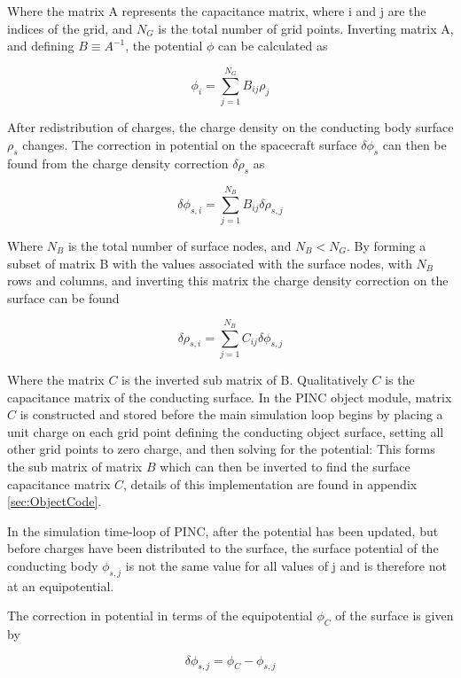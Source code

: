 Where the matrix A represents the capacitance matrix, where i and j are the indices of the grid, and $N_G$ is the total number of grid points. Inverting matrix A, and defining $B \equiv A^{-1}$, the potential $\phi$ can be calculated as 

\begin{equation}
    \phi_i = \sum^{N_G}_{j=1} B_{ij} \rho_j
\end{equation}


After redistribution of charges, the charge density on the conducting body surface $\rho_s$ changes. The correction in potential on the spacecraft surface $\delta \phi_s$ can then be found from the charge density correction $\delta \rho_s$ as

\begin{equation}
    \delta \phi_{s,i} = \sum^{N_B}_{j=1} B_{ij} \delta \rho_{s,j}
\end{equation}

Where $N_B$ is the total number of surface nodes, and $N_B < N_G$. By forming a subset of matrix B with the values associated with the surface nodes, with $N_B$ rows and columns, and inverting this matrix the charge density correction on the surface can be found

\begin{equation}\label{eq:SCchargeCorr}
    \delta \rho_{s,i} = \sum^{N_B}_{j=1} C_{ij} \delta \phi_{s,j}
\end{equation}

Where the matrix $C$ is the inverted sub matrix of B. Qualitatively $C$ is the capacitance matrix of the conducting surface. In the PINC object module, matrix $C$ is constructed and stored before the main simulation loop begins by placing a unit charge on each grid point defining the conducting object surface, setting all other grid points to zero charge, and then solving for the potential: This forms the sub matrix of matrix $B$ which can then be inverted to find the surface capacitance matrix $C$, details of this implementation are found in appendix \ref{sec:ObjectCode}.

In the simulation time-loop of PINC, after the potential has been updated, but before charges have been distributed to the surface, the surface potential of the conducting body $\phi_{s,j}$ is not the same value for all values of j and is therefore not at an equipotential. 

The correction in potential in terms of the equipotential $\phi_C$ of the surface is given by

\begin{equation}\label{eq:SCphiCorrEqui}
    \delta \phi_{s,j} = \phi_C - \phi_{s,j}
\end{equation}

